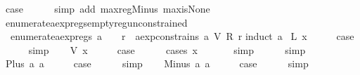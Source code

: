 \begin{isabellebody}
\ {\isacharquery}case\isanewline
\ \ \ \ \isamarkupfalse%
\ {\isacharparenleft}simp\ add{\isacharcolon}\ max{\isacharunderscore}reg{\isacharunderscore}Minus\ max{\isacharunderscore}is{\isacharunderscore}None{\isacharparenright}\isanewline
{}\isamarkupfalse%
%
\endisatagproof
{\isafoldproof}%
%
\isadelimproof
\isanewline
%
\endisadelimproof
\isanewline
\isanewline
{}\isamarkupfalse%
\ enumerate{\isacharunderscore}aexp{\isacharunderscore}regs{\isacharunderscore}empty{\isacharunderscore}reg{\isacharunderscore}unconstrained{\isacharcolon}\isanewline
\ \ {\isachardoublequoteopen}enumerate{\isacharunderscore}aexp{\isacharunderscore}regs\ a\ {\isacharequal}\ {\isacharbraceleft}{\isacharbraceright}\ {\isasymLongrightarrow}\ {\isasymforall}r{\isachardot}\ {\isasymnot}\ aexp{\isacharunderscore}constrains\ a\ {\isacharparenleft}V\ {\isacharparenleft}R\ r{\isacharparenright}{\isacharparenright}{\isachardoublequoteclose}\isanewline
%
\isadelimproof
%
\endisadelimproof
%
\isatagproof
{}\isamarkupfalse%
{\isacharparenleft}induct\ a{\isacharparenright}\isanewline
{}\isamarkupfalse%
\ {\isacharparenleft}L\ x{\isacharparenright}\isanewline
\ \ \isamarkupfalse%
\ \isamarkupfalse%
\ {\isacharquery}case\isanewline
\ \ \ \ \isamarkupfalse%
\ simp\isanewline
{}\isamarkupfalse%
\isanewline
\ \ \isamarkupfalse%
\ {\isacharparenleft}V\ x{\isacharparenright}\isanewline
\ \ \isamarkupfalse%
\ \isamarkupfalse%
\ {\isacharquery}case\isanewline
\ \ \ \ \isamarkupfalse%
\ {\isacharparenleft}cases\ x{\isacharparenright}\isanewline
\ \ \ \ \ \isamarkupfalse%
\ simp\isanewline
\ \ \ \ \isamarkupfalse%
\ simp\isanewline
{}\isamarkupfalse%
\isanewline
\ \ \isamarkupfalse%
\ {\isacharparenleft}Plus\ a{}\ a{}{\isacharparenright}\isanewline
\ \ \isamarkupfalse%
\ \isamarkupfalse%
\ {\isacharquery}case\isanewline
\ \ \ \ \isamarkupfalse%
\ simp\isanewline
{}\isamarkupfalse%
\isanewline
\ \ \isamarkupfalse%
\ {\isacharparenleft}Minus\ a{}\ a{}{\isacharparenright}\isanewline
\ \ \isamarkupfalse%
\ \isamarkupfalse%
\ {\isacharquery}case\isanewline
\ \ \ \ \isamarkupfalse%
\ simp\isanewline
{}\isamarkupfalse%
%
\endisatagproof
{\isafoldproof}%

\end{isabellebody}
